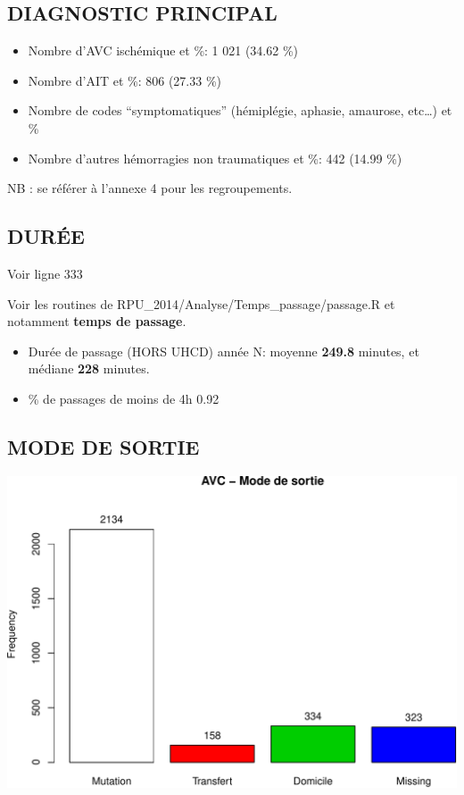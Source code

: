 \documentclass[]{article}
\begin{document}
\subsection{DIAGNOSTIC PRINCIPAL}\label{diagnostic-principal-1}

\begin{itemize}
\itemsep1pt\parskip0pt
\item
  Nombre d'AVC ischémique et \%: 1 021 (34.62 \%)
\item
  Nombre d'AIT et \%: 806 (27.33 \%)
\item
  Nombre de codes ``symptomatiques'' (hémiplégie, aphasie, amaurose,
  etc\ldots{}) et \%
\item
  Nombre d'autres hémorragies non traumatiques et \%: 442 (14.99 \%)
\end{itemize}

NB : se référer à l'annexe 4 pour les regroupements.

\subsection{DURÉE}\label{duree-1}

Voir ligne 333

Voir les routines de RPU\_2014/Analyse/Temps\_passage/passage.R et
notamment \textbf{temps de passage}.

\begin{itemize}
\itemsep1pt\parskip0pt
\item
  Durée de passage (HORS UHCD) année N: moyenne \textbf{249.8} minutes,
  et médiane \textbf{228} minutes.
\item
  \% de passages de moins de 4h 0.92
\end{itemize}

\subsection{MODE DE SORTIE}\label{mode-de-sortie-2}

\includegraphics{rapport2014_V4_files/figure-latex/avc_mode_sortie-1.pdf}
\end{document}
